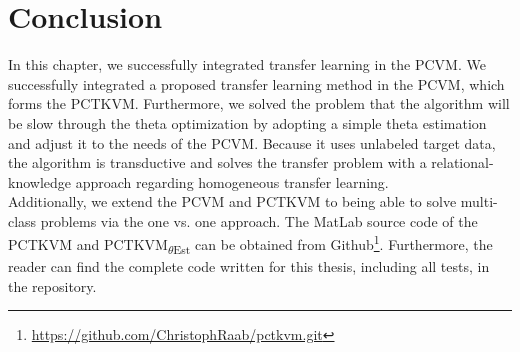 \section{Conclusion}\label{InSecCon}
In this chapter, we successfully integrated transfer learning in the \acs{PCVM}.
We successfully integrated a proposed transfer learning method in the \acs{PCVM}, which forms the \acs{PCTKVM}.
Furthermore, we solved the problem that the algorithm will be slow through the theta optimization by adopting a simple theta estimation and adjust it to the needs of the \acs{PCVM}.
Because it uses unlabeled target data, the algorithm is transductive and solves the transfer problem with a relational-knowledge approach regarding homogeneous transfer learning.\\
Additionally, we extend the \acs{PCVM} and \acs{PCTKVM} to being able to solve multi-class problems via the one vs. one approach.
The MatLab source code of the \acs{PCTKVM} and \acs{PCTKVM}\textsubscript{$\theta$Est} can be obtained from Github\footnote{\url{https://github.com/ChristophRaab/pctkvm.git}}.
Furthermore, the reader can find the complete code written for this thesis, including all tests, in the repository.
